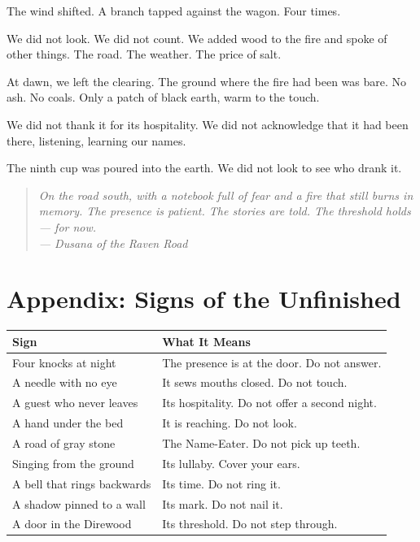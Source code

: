 \documentclass[10pt,twoside]{book}
\newcommand{\dusana}[1]{\begin{quote}\itshape #1 \\ --- Dusana of the Raven Road\end{quote}}
\begin{document}
The wind shifted. A branch tapped against the wagon. Four times.

We did not look. We did not count. We added wood to the fire and spoke of other things. The road. The weather. The price of salt.

At dawn, we left the clearing. The ground where the fire had been was bare. No ash. No coals. Only a patch of black earth, warm to the touch.

We did not thank it for its hospitality. We did not acknowledge that it had been there, listening, learning our names.

The ninth cup was poured into the earth. We did not look to see who drank it.

\dusana{On the road south, with a notebook full of fear and a fire that still burns in memory. The presence is patient. The stories are told. The threshold holds --- for now.}

\chapter*{Appendix: Signs of the Unfinished}

\begin{table}[h]
\centering
\begin{tabularx}{\textwidth}{p{4cm} X}
\toprule
\textbf{Sign} & \textbf{What It Means} \\
\midrule
Four knocks at night & The presence is at the door. Do not answer. \\
A needle with no eye & It sews mouths closed. Do not touch. \\
A guest who never leaves & Its hospitality. Do not offer a second night. \\
A hand under the bed & It is reaching. Do not look. \\
A road of gray stone & The Name-Eater. Do not pick up teeth. \\
Singing from the ground & Its lullaby. Cover your ears. \\
A bell that rings backwards & Its time. Do not ring it. \\
A shadow pinned to a wall & Its mark. Do not nail it. \\
A door in the Direwood & Its threshold. Do not step through. \\
\bottomrule
\end{tabularx}
\end{table}
\end{document}

